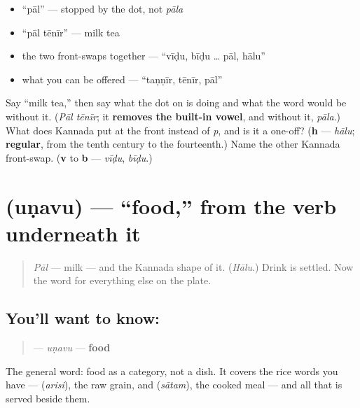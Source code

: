 \begin{itemize}
\raggedright
  \item \textquotedblleft{}pāl\textquotedblright{} — stopped by the dot, not \emph{pāla}
  \item \textquotedblleft{}pāl tēnīr\textquotedblright{} — milk tea
  \item the two front-swaps together — \textquotedblleft{}vīḍu, bīḍu … pāl, hālu\textquotedblright{}
  \item what you can be offered — \textquotedblleft{}taṇṇīr, tēnīr, pāl\textquotedblright{}
\end{itemize}

\begin{tcolorbox}[breakable,colback=teal!4,colframe=teal!35!black,title={Before you move on}]
Say \textquotedblleft{}milk tea,\textquotedblright{} then say what the dot on \textbf{} is doing and what the word would be without it. (\emph{Pāl tēnīr}; it \textbf{removes the built-in vowel}, and without it, \emph{pāla}.) What does Kannada put at the front instead of \emph{p}, and is it a one-off? (\textbf{h} — \emph{hālu}; \textbf{regular}, from the tenth century to the fourteenth.) Name the other Kannada front-swap. (\textbf{v} to \textbf{b} — \emph{vīḍu}, \emph{bīḍu}.)
\end{tcolorbox}
\section[\texorpdfstring{\ta{உணவு} (uṇavu)}{உணவு (uṇavu)}]{ (uṇavu) — \textquotedblleft{}food,\textquotedblright{} from the verb underneath it}

\label{lesson:TA-C36-unavu}



\begin{quote}
\emph{Pāl} — milk — and the Kannada shape of it. (\emph{Hālu}.) Drink is settled. Now the word for everything else on the plate.
\end{quote}

\subsection*{You'll want to know: }
\begin{quote}
\textbf{} — \emph{uṇavu} — \textbf{food}
\end{quote}

The general word: food as a category, not a dish. It covers the rice words you have — \textbf{} (\emph{arisi}), the raw grain, and \textbf{} (\emph{sātam}), the cooked meal — and all that is served beside them.

